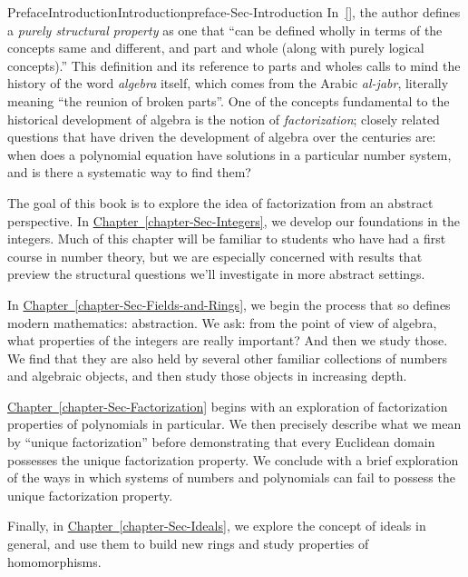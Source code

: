 \documentclass[oneside,10pt,]{book}
\newcommand{\xreffont}{\relax}
\numberwithin{equation}{section}
\begin{document}
\begin{preface}{Preface}{Introduction}{}{Introduction}{}{}{preface-Sec-Introduction}
In~\hyperlink{biblio-franklin2014aristotelian}{[{\xreffont 1}]}, the author defines a \emph{purely structural property} as one that ``can be defined wholly in terms of the concepts same and different, and part and whole (along with purely logical concepts).'' This definition and its reference to parts and wholes calls to mind the history of the word \emph{algebra} itself, which comes from the Arabic \emph{al-jabr}, literally meaning ``the reunion of broken parts''. One of the concepts fundamental to the historical development of algebra is the notion of \emph{factorization}; closely related questions that have driven the development of algebra over the centuries are: when does a polynomial equation have solutions in a particular number system, and is there a systematic way to find them?%
\par
The goal of this book is to explore the idea of factorization from an abstract perspective. In \hyperref[chapter-Sec-Integers]{Chapter~{\xreffont\ref{chapter-Sec-Integers}}}, we develop our foundations in the integers. Much of this chapter will be familiar to students who have had a first course in number theory, but we are especially concerned with results that preview the structural questions we'll investigate in more abstract settings.%
\par
In \hyperref[chapter-Sec-Fields-and-Rings]{Chapter~{\xreffont\ref{chapter-Sec-Fields-and-Rings}}}, we begin the process that so defines modern mathematics: abstraction. We ask: from the point of view of algebra, what properties of the integers are really important? And then we study those. We find that they are also held by several other familiar collections of numbers and algebraic objects, and then study those objects in increasing depth.%
\par
\hyperref[chapter-Sec-Factorization]{Chapter~{\xreffont\ref{chapter-Sec-Factorization}}} begins with an exploration of factorization properties of polynomials in particular. We then precisely describe what we mean by ``unique factorization'' before demonstrating that every Euclidean domain possesses the unique factorization property. We conclude with a brief exploration of the ways in which systems of numbers and polynomials can fail to possess the unique factorization property.%
\par
Finally, in \hyperref[chapter-Sec-Ideals]{Chapter~{\xreffont\ref{chapter-Sec-Ideals}}}, we explore the concept of ideals in general, and use them to build new rings and study properties of homomorphisms.%

\end{preface}
\end{document}
